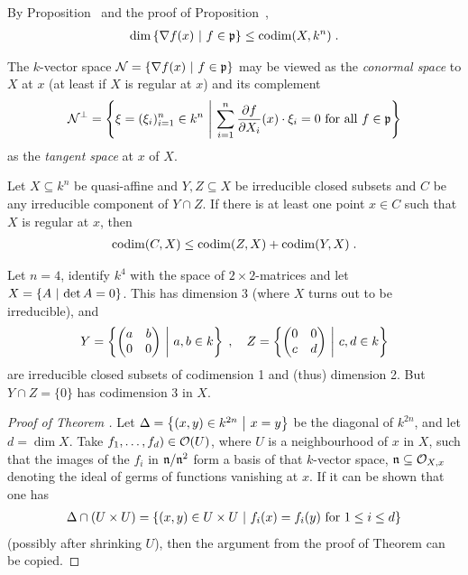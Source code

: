 \documentclass[a4paper,parskip=half,numbers=enddot, DIV=12]{scrreprt}
\begin{document}
		
\begin{rem*}
    By Proposition~ and the proof of Proposition~, 
    \begin{align*}
        \dim\left\{\nabla f(x)\ \middle|\  f\in\mathfrak{p}\right\} \leq \operatorname{codim}(X,k^n)\;.
    \end{align*}
\end{rem*}
\begin{rem}
    The $k$-vector space $\mathcal{N} = \left\{\nabla f(x) \ \middle|\  f\in \mathfrak{p}\right\}$ may be viewed as the \emph{conormal space} to $X$ at $x$ (at least if $X$ is regular at $x$) and its complement 
    \begin{align*}
        \mathcal{N}^\perp = \left\{ \xi = (\xi_i)_{i=1}^n \in k^n \ \middle|\  \sum_{i=1}^{n}\frac{\partial f}{\partial X_i}(x)\cdot\xi_i=0 \text{ for all } f\in \mathfrak{p}\right\}
    \end{align*}
    as the \emph{tangent space} at $x$ of $X$.
\end{rem}
\begin{thm}
    Let $X\subseteq k^n$ be quasi-affine and $Y,Z \subseteq X$ be irreducible closed subsets and $C$ be any irreducible component of $Y\cap Z$. If there is at least one point $x\in C$ such that $X$ is regular at $x$, then 
    \begin{align*}
    	\operatorname{codim}(C,X) \leq \operatorname{codim} (Z,X)+\operatorname{codim}(Y,X)\;.
    \end{align*}
\end{thm}
\begin{rem}
    Let $n=4$, identify $k^4$ with the space of $2\times 2$-matrices and let $X= \left\{ A\ \middle|\  \operatorname{det} A = 0\right\}$. This has dimension 3 (where $X$ turns out to be irreducible), and 
    \begin{align*}
        Y = \left\{\begin{pmatrix} a&b\\ 0&0\end{pmatrix} \ \middle|\  a,b\in k \right\}\;,\quad
        Z = \left\{\begin{pmatrix} 0&0\\ c&d\end{pmatrix} \ \middle|\  c,d\in k \right\}
    \end{align*}  
    are irreducible closed subsets of codimension 1 and (thus) dimension 2. But $Y\cap Z = \{0\}$ has codimension 3 in $X$.
\end{rem}
\begin{proof}[Proof of Theorem ]
    Let $ \Delta = \left\{(x,y)\in k^{2n}\ \middle|\  x=y\right\}$ be the diagonal of $k^{2n}$, and let $d = \dim X$. Take $f_1,\ldots, f_d)\in\mathcal{O}(U)$, where $U$ is a neighbourhood of $x$ in $X$, such that the images of the $f_i$ in $\mathfrak{n}/\mathfrak{n}^2$ form a basis of that $k$-vector space, $\mathfrak{n}\subseteq \mathcal{O}_{X,x}$ denoting the ideal of germs of functions vanishing at $x$. If it can be shown that one has 
    \begin{align*}
        \Delta \cap (U\times U) = \left\{(x,y)\in U\times U \ \middle|\  f_i(x) = f_i(y) \text{ for } 1\leq i \leq d\right\}
    \end{align*}
    (possibly after shrinking $U$), then the argument from the proof of Theorem  can be copied.
\end{proof}
\end{document}
